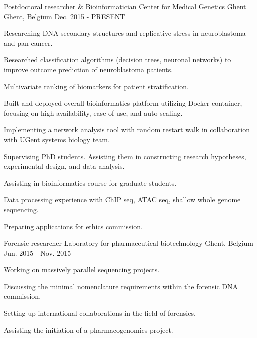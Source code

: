 \begin{cventries}
  \cventry
    {Postdoctoral researcher \& Bioinformatician} %
    {Center for Medical Genetics Ghent} %
    {Ghent, Belgium} %
    {Dec. 2015 - PRESENT} %
    {
      \begin{cvitems} %
        \item {Researching DNA secondary structures and replicative
            stress in neuroblastoma and pan-cancer.}
        \item {Researched classification algorithms (decision trees,
            neuronal networks) to improve outcome prediction of
            neuroblastoma patients.}
        \item {Multivariate ranking of biomarkers for patient stratification.}
      \item {Built and deployed overall bioinformatics platform
          utilizing Docker container, focusing on high-availability,
          ease of use, and auto-scaling.}
      \item {Implementing a network analysis tool with random restart
          walk in collaboration with UGent systems biology team.}
      \item {Supervising PhD students. Assisting them in constructing
          research hypotheses, experimental design, and data
          analysis.}
      \item {Assisting in bioinformatics course for graduate
          students.}
      \item {Data processing experience with ChIP seq, ATAC seq,
          shallow whole genome sequencing.}
      \item {Preparing applications for ethics commission.}
      \end{cvitems}
    }

  \cventry
    {Forensic researcher} %
    {Laboratory for pharmaceutical biotechnology} %
    {Ghent, Belgium} %
    {Jun. 2015 - Nov. 2015} %
    {
      \begin{cvitems} %
        \item {Working on massively parallel sequencing projects.}
        \item {Discussing the minimal nomenclature requirements within
          the forensic DNA commission.}
        \item {Setting up international collaborations in the field of
            forensics.}
        \item {Assisting the initiation of a pharmacogenomics project.}
      \end{cvitems}
    }


\end{cventries}
